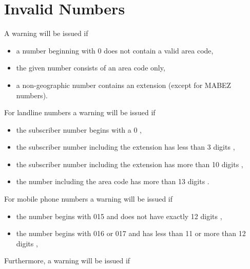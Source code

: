 \documentclass[numbers=noenddot]{scrreprt}
\newcommand\UeberschriftUngueltig{\section{Invalid Numbers}}
\newcommand\WarnungWenn{A warning will be issued if}
\begin{document}
\UeberschriftUngueltig
\WarnungWenn
\begin{itemize}
\item a number beginning with 0 does not contain a valid area code,
\item the given number consists of an area code only,
\item a non-geographic number contains an extension (except for MABEZ numbers).
\end{itemize}
For landline numbers a warning will be issued if
\begin{itemize}
\item the subscriber number begins with a 0 \cite[6]{BNA-nummernplan},
\item the subscriber number including the extension has less than 3 digits \cite[6]{BNA-nummernplan},
\item the subscriber number including the extension has more than 10 digits \cite[2]{BNA-Struktur},
\item the number including the area code has more than 13 digits \cite[2]{BNA-Struktur}.
\end{itemize}
For mobile phone numbers a warning will be issued if
\begin{itemize}
\item the number begins with 015 and does not have exactly 12 digits \cite[49\psq]{BNA-konzept},
\item the number begins with 016 or 017 and has less than 11 or more than 12 digits \cite[50]{BNA-konzept},
\end{itemize}
Furthermore, a warning will be issued if
\end{document}
